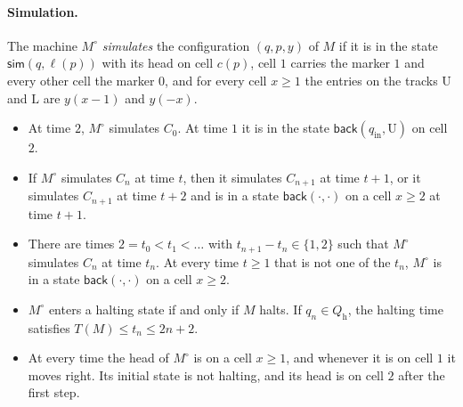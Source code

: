 \paragraph{Simulation.} The machine $M^\circ$ \emph{simulates} the configuration $(q,p,y)$ of $M$ if it is in the state $\mathsf{sim}(q,\ell(p))$ with its head on cell $c(p)$, cell $1$ carries the marker $1$ and every other cell the marker $0$, and for every cell $x\ge1$ the entries on the tracks $\mathrm U$ and $\mathrm L$ are $y(x-1)$ and $y(-x)$.

\begin{lemma}\label{app:oneside}
\begin{itemize}
\item[(a)] At time $2$, $M^\circ$ simulates $C_0$. At time $1$ it is in the state $\mathsf{back}(q_{\mathrm{in}},\mathrm U)$ on cell $2$.
\item[(b)] If $M^\circ$ simulates $C_n$ at time $t$, then it simulates $C_{n+1}$ at time $t+1$, or it simulates $C_{n+1}$ at time $t+2$ and is in a state $\mathsf{back}(\cdot,\cdot)$ on a cell $x\ge2$ at time $t+1$.
\item[(c)] There are times $2=t_0<t_1<\dots$ with $t_{n+1}-t_n\in\{1,2\}$ such that $M^\circ$ simulates $C_n$ at time $t_n$. At every time $t\ge1$ that is not one of the $t_n$, $M^\circ$ is in a state $\mathsf{back}(\cdot,\cdot)$ on a cell $x\ge2$.
\item[(d)] $M^\circ$ enters a halting state if and only if $M$ halts. If $q_n\in Q_{\mathrm h}$, the halting time satisfies $T(M)\le t_n\le2n+2$.
\item[(e)] At every time the head of $M^\circ$ is on a cell $x\ge1$, and whenever it is on cell $1$ it moves right. Its initial state is not halting, and its head is on cell $2$ after the first step.
\end{itemize}
\end{lemma}

